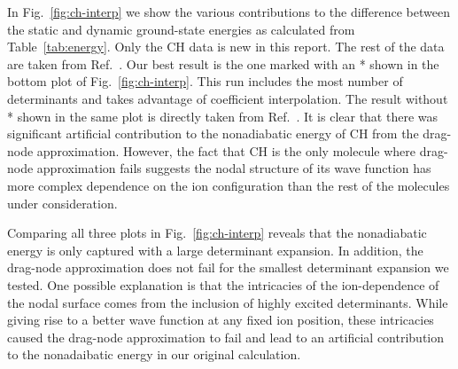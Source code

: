 \documentclass[aip,jcp,numerical,reprint]{revtex4-1}
\begin{document}
In Fig.~\ref{fig:ch-interp} we show the various contributions to the difference between the static and dynamic ground-state energies as calculated from Table~\ref{tab:energy}. Only the CH data is new in this report. The rest of the data are taken from Ref.~\cite{Yang2015}. Our best result is the one marked with an * shown in the bottom plot of Fig.~\ref{fig:ch-interp}. This run includes the most number of determinants and takes advantage of coefficient interpolation. The result without * shown in the same plot is directly taken from Ref.~\cite{Yang2015}. It is clear that there was significant artificial contribution to the nonadiabatic energy of CH from the drag-node approximation. However, the fact that CH is the only molecule where drag-node approximation fails suggests the nodal structure of its wave function has more complex dependence on the ion configuration than the rest of the molecules under consideration.

Comparing all three plots in Fig.~\ref{fig:ch-interp} reveals that the nonadiabatic energy is only captured with a large determinant expansion. In addition, the drag-node approximation does not fail for the smallest determinant expansion we tested. One possible explanation is that the intricacies of the ion-dependence of the nodal surface comes from the inclusion of highly excited determinants. While giving rise to a better wave function at any fixed ion position, these intricacies caused the drag-node approximation to fail and lead to an artificial contribution to the nonadaibatic energy in our original calculation.
\end{document}
